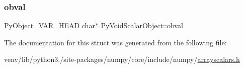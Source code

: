 \mbox{\label{structPyVoidScalarObject_af7db74c44246f091c473bf87de502622}} 
\subsubsection{\texorpdfstring{obval}{obval}}
{\footnotesize\ttfamily Py\+Object\+\_\+\+V\+A\+R\+\_\+\+H\+E\+AD char$\ast$ Py\+Void\+Scalar\+Object\+::obval}



The documentation for this struct was generated from the following file\+:\begin{DoxyCompactItemize}
\item 
venv/lib/python3./site-\/packages/numpy/core/include/numpy/\hyperlink{arrayscalars_8h}{arrayscalars.\+h}\end{DoxyCompactItemize}
